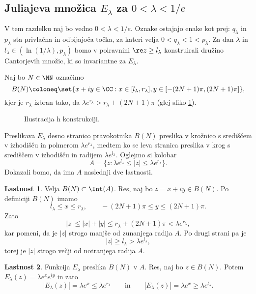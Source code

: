 \subsection{Juliajeva množica \texorpdfstring{\(E_\lambda\)}{E\_\lambda} za \texorpdfstring{\(0 < \lambda < 1/e\)}{0 < \lambda < 1/e}}

V tem razdelku naj bo vedno \(0 < \lambda < 1/e\). Oznake ostajajo enake kot prej: \(q_\lambda\) in \(p_\lambda\) sta privlačna in odbijajoča točka, za kateri velja \(0 < q_\lambda < 1 < p_\lambda\). Za dan \(\lambda\) in \(l_\lambda \in (\ln (1 / \lambda), p_\lambda)\) bomo v polravnini \(\re z \geq l_\lambda\) konstruirali družino Cantorjevih množic, ki so invariantne za \(E_\lambda\).

Naj bo \(N \in \NN\) označimo
\[B(N) \coloneq \set{x + iy \in \CC : x \in [l_\lambda, r_\lambda], y \in [- (2N + 1) \pi, (2N + 1) \pi]},\]
kjer je \(r_\lambda\) izbran tako, da \(\lambda e^{r_\lambda} > r_\lambda + (2N + 1) \pi\) (glej sliko \ref{fig:konstrukcija}).
\begin{figure}%
    \centering
    
    \caption{Ilustracija h konstrukciji.}
    \label{fig:konstrukcija}
\end{figure}
Preslikava \(E_\lambda\) desno stranico pravokotnika \(B (N)\) preslika v krožnico s središčem v izhodišču in polmerom \(\lambda e^{r_\lambda}\), medtem ko se leva stranica preslika v krog s središčem v izhodišču in radijem \(\lambda e^{l_\lambda}\). Oglejmo si kolobar
\[A = \{z : \lambda e^{l_\lambda} \leq |z| \leq \lambda e^{r_\lambda}\}.\]
Dokazali bomo, da ima \(A\) naslednji dve lastnosti.

\vspace{5mm}
\noindent \textbf{Lastnost 1}. Velja \(B (N) \subset \Int (A)\). Res, naj  bo \(z = x + i y \in B (N)\). Po definiciji \(B (N)\) imamo
\[l_\lambda \leq x \leq r_\lambda, \qquad - (2N + 1) \pi \leq y \leq (2N + 1) \pi.\]
Zato
\[|z| \leq |x| + |y| \leq r_\lambda + (2N + 1) \pi < \lambda e^{r_\lambda},\]
kar pomeni, da je \(|z|\) strogo manjše od zunanjega radija \(A\). Po drugi strani pa je
\[|z| \geq l_\lambda > \lambda e^{l_\lambda},\]
torej je \(|z|\) strogo večji od notranjega radija \(A\).

\noindent \textbf{Lastnost 2}. Funkcija \(E_\lambda\) preslika \(B (N)\) v \(A\). Res, naj bo \(z \in B (N)\). Potem \(E_\lambda (z) = \lambda e^x e^{i y}\) in zato
\[|E_\lambda (z)| = \lambda e^x \leq \lambda e^{r_\lambda} \qquad \text{in} \qquad |E_\lambda (z)| = \lambda e^x \geq \lambda e^{l_\lambda}.\]
\vspace{5mm}

